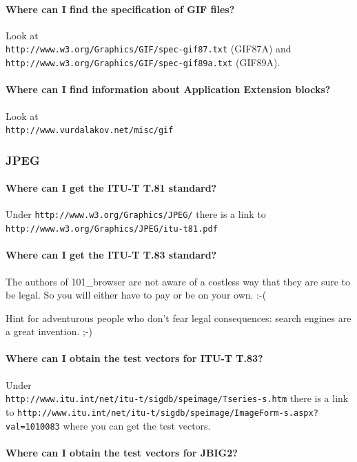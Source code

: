 \documentclass[10pt]{scrbook}
\begin{document}
\paragraph{Where can I find the specification of GIF files?}
Look at \\
\verb|http://www.w3.org/Graphics/GIF/spec-gif87.txt| (GIF87A) and \\
\verb|http://www.w3.org/Graphics/GIF/spec-gif89a.txt| (GIF89A).

\paragraph{Where can I find information about Application Extension blocks?}
Look at \\
\verb|http://www.vurdalakov.net/misc/gif|

\subsubsection{JPEG}

\paragraph{Where can I get the ITU-T T.81 standard?} Under \verb|http://www.w3.org/Graphics/JPEG/| there is a link to \verb|http://www.w3.org/Graphics/JPEG/itu-t81.pdf|

\paragraph{Where can I get the ITU-T T.83 standard?} The authors of 101\_browser are not aware of a costless way that they are sure to be legal. So you will either have to pay or be on your own. :-(

Hint for adventurous people who don't fear legal consequences: search engines are a great invention. ;-)

\paragraph{Where can I obtain the test vectors for ITU-T T.83?} Under \\
\verb|http://www.itu.int/net/itu-t/sigdb/speimage/Tseries-s.htm|
there is a link to
\verb|http://www.itu.int/net/itu-t/sigdb/speimage/ImageForm-s.aspx?val=1010083|
where you can get the test vectors.

\paragraph{Where can I obtain the test vectors for JBIG2?}
\end{document}
